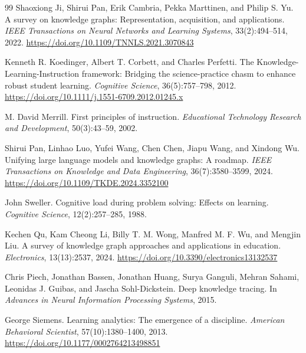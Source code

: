 \documentclass[11pt,letterpaper]{article}
\begin{document}
\begin{thebibliography}{99}
Shaoxiong Ji, Shirui Pan, Erik Cambria, Pekka Marttinen, and Philip S. Yu.
\newblock A survey on knowledge graphs: Representation, acquisition, and applications.
\newblock \emph{IEEE Transactions on Neural Networks and Learning Systems}, 33(2):494--514, 2022.
\newblock \href{https://doi.org/10.1109/TNNLS.2021.3070843}{https://doi.org/10.1109/TNNLS.2021.3070843}

Kenneth R. Koedinger, Albert T. Corbett, and Charles Perfetti.
\newblock The Knowledge-Learning-Instruction framework: Bridging the science-practice chasm to enhance robust student learning.
\newblock \emph{Cognitive Science}, 36(5):757--798, 2012.
\newblock \href{https://doi.org/10.1111/j.1551-6709.2012.01245.x}{https://doi.org/10.1111/j.1551-6709.2012.01245.x}

M. David Merrill.
\newblock First principles of instruction.
\newblock \emph{Educational Technology Research and Development}, 50(3):43--59, 2002.

Shirui Pan, Linhao Luo, Yufei Wang, Chen Chen, Jiapu Wang, and Xindong Wu.
\newblock Unifying large language models and knowledge graphs: A roadmap.
\newblock \emph{IEEE Transactions on Knowledge and Data Engineering}, 36(7):3580--3599, 2024.
\newblock \href{https://doi.org/10.1109/TKDE.2024.3352100}{https://doi.org/10.1109/TKDE.2024.3352100}

John Sweller.
\newblock Cognitive load during problem solving: Effects on learning.
\newblock \emph{Cognitive Science}, 12(2):257--285, 1988.

Kechen Qu, Kam Cheong Li, Billy T. M. Wong, Manfred M. F. Wu, and Mengjin Liu.
\newblock A survey of knowledge graph approaches and applications in education.
\newblock \emph{Electronics}, 13(13):2537, 2024.
\newblock \href{https://doi.org/10.3390/electronics13132537}{https://doi.org/10.3390/electronics13132537}

Chris Piech, Jonathan Bassen, Jonathan Huang, Surya Ganguli, Mehran Sahami, Leonidas J. Guibas, and Jascha Sohl-Dickstein.
\newblock Deep knowledge tracing.
\newblock In \emph{Advances in Neural Information Processing Systems}, 2015.

George Siemens.
\newblock Learning analytics: The emergence of a discipline.
\newblock \emph{American Behavioral Scientist}, 57(10):1380--1400, 2013.
\newblock \href{https://doi.org/10.1177/0002764213498851}{https://doi.org/10.1177/0002764213498851}


\end{thebibliography}
\end{document}

